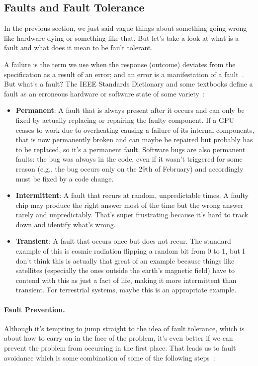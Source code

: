 \subsection*{Faults and Fault Tolerance}
In the previous section, we just said vague things about something going wrong like hardware dying or something like that. But let's take a look at what is a fault and what does it mean to be fault tolerant.

A failure is the term we use when the response (outcome) deviates from the specification as a result of an error; and an error is a manifestation of a fault~\cite{mte241}. But what's a fault? The IEEE Standards Dictionary and some textbooks define a fault as an erroneous hardware or software state of some variety~\cite{osi}:

\begin{itemize}
	\item \textbf{Permanent}: A fault that is always present after it occurs and can only be fixed by actually replacing or repairing the faulty component. If a GPU ceases to work due to overheating causing a failure of its internal components, that is now permanently broken and can maybe be repaired but probably has to be replaced, so it's a permanent fault. Software bugs are also permanent faults: the bug was always in the code, even if it wasn't triggered for some reason (e.g., the bug occurs only on the 29th of February) and accordingly must be fixed by a code change.
	
	\item \textbf{Intermittent}: A fault that recurs at random, unpredictable times. A faulty chip may produce the right answer most of the time but the wrong answer rarely and unpredictably. That's super frustrating because it's hard to track down and identify what's wrong.

	\item \textbf{Transient}: A fault that occurs once but does not recur. The standard example of this is cosmic radiation flipping a random bit from 0 to 1, but I don't think this is actually that great of an example because things like satellites (especially the ones outside the earth's magnetic field) have to contend with this as just a fact of life, making it more intermittent than transient. For terrestrial systems, maybe this is an appropriate example.

\end{itemize}

\paragraph{Fault Prevention.} 
Although it's tempting to jump straight to the idea of fault tolerance, which is about how to carry on in the face of the problem, it's even better if we can prevent the problem from occurring in the first place. That leads us to fault avoidance which is some combination of some of the following steps~\cite{mte241}:

